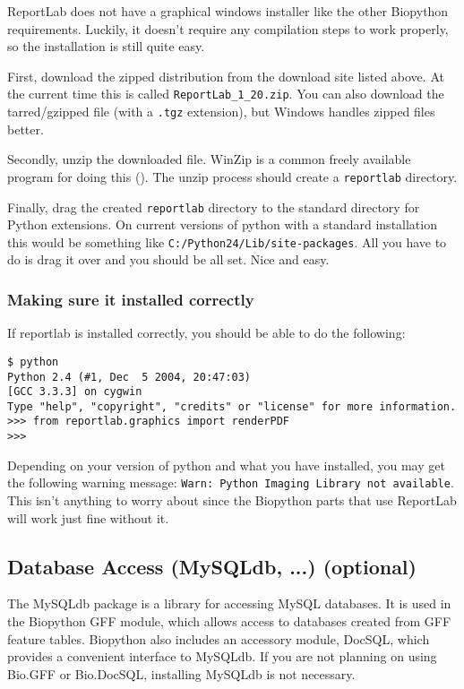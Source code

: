 \documentclass{article}
\begin{document}
ReportLab does not have a graphical windows installer like the other
Biopython requirements. Luckily, it doesn't require any compilation
steps to work properly, so the installation is still quite easy. 


First, download the zipped distribution from the download site listed
above. At the current time this is called \verb|ReportLab_1_20.zip|. You
can also download the tarred/gzipped file (with a \verb|.tgz|
extension), but Windows handles zipped files better.


Secondly, unzip the downloaded file. WinZip is a common freely available
program for doing this
(). The unzip process
should create a \verb|reportlab| directory.


Finally, drag the created \verb|reportlab| directory to the standard
directory for Python extensions. On current versions of python with a
standard installation this would be something like 
\verb|C:/Python24/Lib/site-packages|. All you have to do is drag it over
and you should be all set. Nice and easy.

\subsubsection{Making sure it installed correctly}

If reportlab is installed correctly, you should be able to do the
following:

\begin{verbatim}
$ python
Python 2.4 (#1, Dec  5 2004, 20:47:03)
[GCC 3.3.3] on cygwin
Type "help", "copyright", "credits" or "license" for more information.
>>> from reportlab.graphics import renderPDF
>>>
\end{verbatim}

Depending on your version of python and what you have installed, you may
get the following warning message: 
\verb|Warn: Python Imaging Library not available|.  This isn't anything
to worry about since the Biopython parts that use ReportLab will work
just fine without it.

\subsection{Database Access (MySQLdb, ...) (optional)}

The MySQLdb package is a library for accessing MySQL databases. It is
used in the Biopython GFF module, which allows access to databases
created from GFF feature tables. Biopython also includes an accessory
module, DocSQL, which provides a convenient interface to MySQLdb. 
If you are not planning on using Bio.GFF or Bio.DocSQL, installing
MySQLdb is not necessary.
\end{document}
